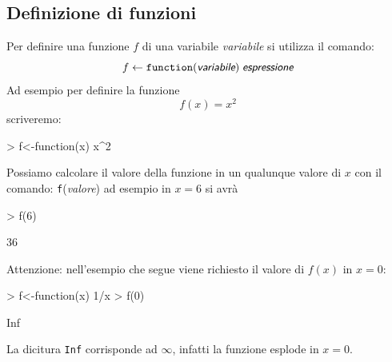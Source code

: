 \documentclass[onecolumn,11pt]{book}
\newcommand{\varia}[1]{\textsl{\textsf{#1}}}
\begin{document}
\subsection{Definizione di funzioni}
Per definire una funzione $f$ di una variabile \varia{variabile}  si utilizza il comando:
$$f\leftarrow \texttt{function}(\varia{variabile})\; \varia{espressione}$$
Ad esempio per definire la funzione $$f(x)=x^2$$ scriveremo:
\begin{Schunk}
\begin{Sinput}
> f<-function(x) x^2
\end{Sinput}
\end{Schunk}
Possiamo calcolare il valore della funzione in un qualunque valore di $x$  con il comando:
\texttt{f}(\varia{valore})
ad esempio in $x=6$ si avr\`a
\begin{Schunk}
\begin{Sinput}
> f(6)
\end{Sinput}
\begin{Soutput}
[1] 36
\end{Soutput}
\end{Schunk}
Attenzione: nell'esempio che segue viene richiesto il valore di $f(x)$ in $x=0$:
\begin{Schunk}
\begin{Sinput}
> f<-function(x)  1/x
> f(0)
\end{Sinput}
\begin{Soutput}
[1] Inf
\end{Soutput}
\end{Schunk}
La dicitura \texttt{Inf} corrisponde ad $\infty$, infatti la funzione esplode in $x=0$.
\end{document}
